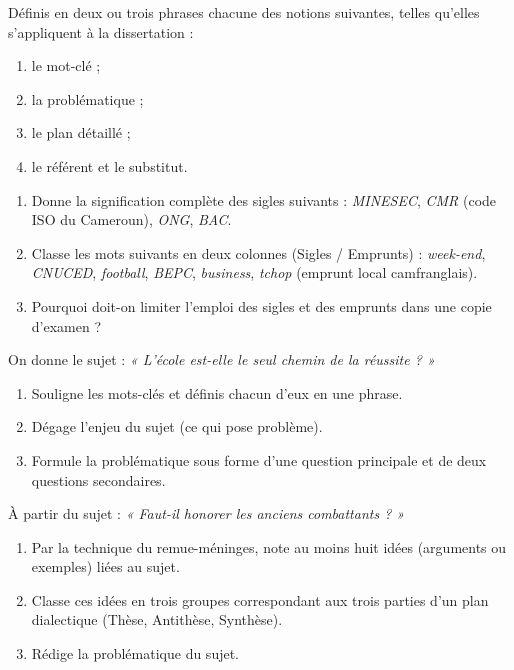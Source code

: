 \documentclass[11pt]{article}
\newcounter{popsec}
\newcounter{popsub}
\newcommand{\courssub}[1]{%
  \stepcounter{popsub}%
  \par\vspace{9pt}\noindent{\popxbold\fontsize{11.5}{13}\selectfont\color{popink}{\color{poporange}\thepopsec.\thepopsub}\hspace{6pt}#1}\par\nopagebreak\vspace{4pt}
}
\begin{document}
\begin{exercice}[Définitions]
Définis en deux ou trois phrases chacune des notions suivantes, telles qu'elles s'appliquent à la dissertation :
\begin{enumerate}
\item le mot-clé ;
\item la problématique ;
\item le plan détaillé ;
\item le référent et le substitut.
\end{enumerate}
\end{exercice}

\begin{exercice}
\begin{enumerate}
\item Donne la signification complète des sigles suivants : \emph{MINESEC}, \emph{CMR} (code ISO du Cameroun), \emph{ONG}, \emph{BAC}.
\item Classe les mots suivants en deux colonnes (Sigles / Emprunts) : \emph{week-end}, \emph{CNUCED}, \emph{football}, \emph{BEPC}, \emph{business}, \emph{tchop} (emprunt local camfranglais).
\item Pourquoi doit-on limiter l'emploi des sigles et des emprunts dans une copie d'examen ?
\end{enumerate}
\end{exercice}

\courssub{Je m'entraîne}

\begin{exercice}
On donne le sujet : \emph{« L'école est-elle le seul chemin de la réussite ? »}
\begin{enumerate}
\item Souligne les mots-clés et définis chacun d'eux en une phrase.
\item Dégage l'enjeu du sujet (ce qui pose problème).
\item Formule la problématique sous forme d'une question principale et de deux questions secondaires.
\end{enumerate}
\end{exercice}

\begin{exercice}
À partir du sujet : \emph{« Faut-il honorer les anciens combattants ? »}
\begin{enumerate}
\item Par la technique du remue-méninges, note au moins huit idées (arguments ou exemples) liées au sujet.
\item Classe ces idées en trois groupes correspondant aux trois parties d'un plan dialectique (Thèse, Antithèse, Synthèse).
\item Rédige la problématique du sujet.
\end{enumerate}
\end{exercice}
\end{document}
